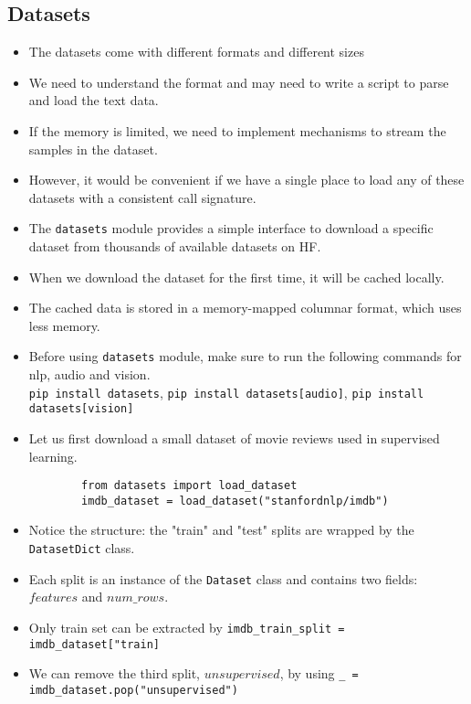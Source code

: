 \documentclass[a4paper]{article}
\begin{document}
\subsection{Datasets}
\begin{itemize}
    \item The datasets come with different formats and different sizes
    \item We need to understand the format and may need to write a script to parse and load the text data.
    \item If the memory is limited, we need to implement mechanisms to stream the samples in the dataset.
    \item However, it would be convenient if we have a single place to load any of these datasets with a consistent call signature.
    \item The \verb|datasets| module provides a simple interface to download a specific dataset from thousands of available datasets on HF.
    \item When we download the dataset for the first time, it will be cached locally.
    \item The cached data is stored in a memory-mapped columnar format, which uses less memory.
    \item Before using \verb|datasets| module, make sure to run the following commands for nlp, audio and vision.\\
    \verb|pip install datasets|, \verb|pip install datasets[audio]|, \verb|pip install datasets[vision]|
    \item Let us first download a small dataset of movie reviews used in supervised learning.
    \vspace{-1mm}
    \begin{verbatim}
        from datasets import load_dataset
        imdb_dataset = load_dataset("stanfordnlp/imdb")
    \end{verbatim}
    \vspace{-7mm}
    \item Notice the structure: the "train" and "test" splits are wrapped by the \verb|DatasetDict| class.
    \item Each split is an instance of the \verb|Dataset| class and contains two fields: $features$ and $num\_rows$.
    \item Only train set can be extracted by \verb|imdb_train_split = imdb_dataset["train]|
    \item We can remove the third split, $unsupervised$, by using \verb|_ = imdb_dataset.pop("unsupervised")|

\end{itemize}
\end{document}
